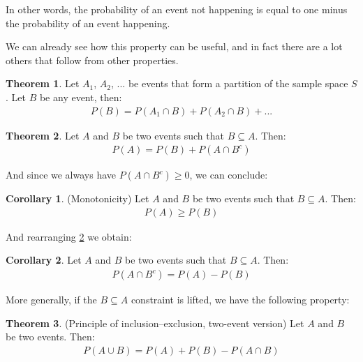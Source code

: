 \documentclass[
  oneside,
  11pt, a4paper,
  footinclude=true,
  headinclude=true,
  cleardoublepage=empty
]{scrbook}
\theoremstyle{definition}
\theoremstyle{definition}
\newtheorem{theorem}{Theorem}[section]
\newtheorem{corollary}{Corollary}[theorem]
\begin{document}
            In other words, the probability of an event not happening is equal to one minus the probability of an event happening.
            
            We can already see how this property can be useful, and in fact there are a lot others that follow from other properties.
            
            \begin{theorem}{Let $A_1$, $A_2$, ... be events that form a partition of the sample space $S$. Let $B$ be any event, then:}
                \begin{align*}
                    P(B) = P(A_1 \cap B) + P(A_2 \cap B) + ...
                \end{align*}{}
            \end{theorem}
            
            \begin{theorem}{Let $A$ and $B$ be two events such that $B \subseteq A$. Then:}\label{2-1-3}
                \begin{align*}
                    P(A) = P(B) + P(A \cap B^c)
                \end{align*}{}
            \end{theorem}
            
            And since we always have $P(A \cap B^c) \geq 0$, we can conclude:
            \begin{corollary}{(Monotonicity) Let $A$ and $B$ be two events such that $B \subseteq A$. Then:}
                \begin{align*}
                    P(A) \geq P(B)
                \end{align*}{}
            \end{corollary}
            
            And rearranging \ref{2-1-3} we obtain:
            \begin{corollary}{Let $A$ and $B$ be two events such that $B \subseteq A$. Then:}
                \begin{align*}
                    P(A \cap B^c) = P(A) - P(B)
                \end{align*}{}
            \end{corollary}
            
            More generally, if the $B \subseteq A$ constraint is lifted, we have the following property:
            \begin{theorem}{(Principle of inclusion–exclusion, two-event version) Let $A$ and $B$ be two events. Then:}\label{2-1-4}
                \begin{align}\label{t-2-1-4}
                    P(A \cup B) = P(A) + P(B) - P(A \cap B)
                \end{align}{}
            \end{theorem}
            
\end{document}
